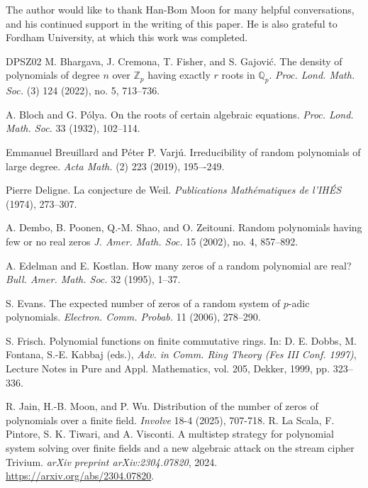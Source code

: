 \documentclass[12pt]{amsart}
\theoremstyle{definition}
\newcommand{\QQ}{\mathbb{Q} }
\newcommand{\ZZ}{\mathbb{Z} }
\begin{document}
\acknowledgement
The author would like to thank Han-Bom Moon for many helpful conversations, and his continued support in the writing of this paper. He is also grateful to Fordham University, at which this work was completed.

\begin{thebibliography}{DPSZ02}
M. Bhargava, J. Cremona, T. Fisher, and S. Gajovi\'c. 
The density of polynomials of degree $n$ over $\ZZ_p$ having exactly $r$ roots in $\QQ_p$.
{\em Proc. Lond. Math. Soc.} (3) 124 (2022), no. 5, 713--736.

A. Bloch and G. P\'{o}lya. 
On the roots of certain algebraic equations.
{\em Proc. Lond. Math. Soc.} 33 (1932), 102–114.

Emmanuel Breuillard and P\'{e}ter P. Varj\'{u}. 
Irreducibility of random polynomials of large degree.
{\em Acta Math.} (2) 223 (2019), 195–-249.

Pierre Deligne.
La conjecture de Weil.
{\em Publications Mathématiques de l'IHÉS} (1974), 273--307.

A. Dembo, B. Poonen, Q.-M. Shao, and O. Zeitouni. 
Random polynomials having few or no real zeros
{\em J. Amer. Math. Soc.} 15 (2002), no. 4, 857--892.

A. Edelman and E. Kostlan. 
How many zeros of a random polynomial are real?
{\em Bull. Amer. Math. Soc.} 32 (1995), 1--37.

S. Evans. 
The expected number of zeros of a random system of $p$-adic polynomials.
{\em Electron. Comm. Probab.} 11 (2006), 278--290.

S. Frisch. 
Polynomial functions on finite commutative rings. 
In: D. E. Dobbs, M. Fontana, S.-E. Kabbaj (eds.), 
{\em Adv. in Comm. Ring Theory (Fes III Conf. 1997)}, 
Lecture Notes in Pure and Appl. Mathematics, vol. 205, Dekker, 1999, pp. 323–336.

R. Jain, H.-B. Moon, and P. Wu.
Distribution of the number of zeros of polynomials over a finite field.
{\em Involve} 18-4 (2025), 707-718.
R. La Scala, F. Pintore, S. K. Tiwari, and A. Visconti. 
A multistep strategy for polynomial system solving over finite fields and a new algebraic attack on the stream cipher Trivium.
{\em arXiv preprint arXiv:2304.07820}, 2024.
\href{https://arxiv.org/abs/2304.07820}{https://arxiv.org/abs/2304.07820}.


\end{thebibliography}
\end{document}
